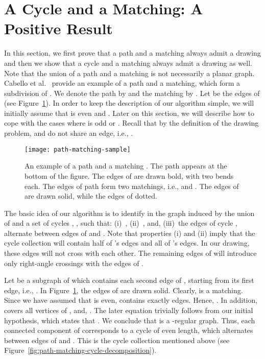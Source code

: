 \documentclass{llncs}
\begin{document}
\section{A Cycle and a Matching: A Positive Result}
\label{sec:cycle-matching}


In this section, we first prove that a path and a matching always
admit a  drawing and then we show that a cycle and a
matching always admit a  drawing as well. Note that the
union of a path and a matching is not necessarily a planar graph.
Cabello et al.\ \cite{CvKLMSV11} provide an example of a path and a
matching, which form a subdivision of . We denote the path
by  and the matching by . Let  be the edges of
 (see Figure~\ref{fig:path-matching-sample}). In order
to keep the description of our algorithm simple, we will initially
assume that  is even and . Later on this
section, we will describe how to cope with the cases where  is
odd or . Recall that by the definition of the
 drawing problem,  and  do not
share an edge, i.e., .





\begin{figure}[h!tb]
  \centering
  \texttt{[image: path-matching-sample]}
  \caption{An example of a path  and a matching .
  The path appears at the bottom of the figure. The edges of  are drawn bold, with two bends each.
  The edges of path  form two matchings, i.e., 
  and . The edges of  are drawn solid, while the edges of  dotted. }
  \label{fig:path-matching-sample}
\end{figure}

The basic idea of our algorithm is to identify in the graph induced
by the union of  and  a set of cycles
, ,
such that: (i)~, (ii)~, and, (iii)~the
edges of cycle ,   alternate between
edges of  and . Note that properties (i)
and (ii) imply that the cycle collection will contain half of
's edges and all of 's edges. In our
drawing, these edges will not cross with each other. The remaining
edges of  will introduce only right-angle crossings
with the edges of .

Let  be a subgraph of  which
contains each second edge of , starting from its first
edge, i.e., . In Figure~\ref{fig:path-matching-sample}, the
edges of  are drawn solid. Clearly,
 is a matching. Since we have assumed that  is
even,  contains exactly  edges. Hence,
. In addition,
 covers all vertices of , and,
. The later
equation trivially follows from our initial hypothesis, which states
that . We conclude
that  is a -regular graph.
Thus, each connected component of  corresponds to a cycle of even length, which alternates
between edges of  and . This is the
cycle collection mentioned above (see
Figure~\ref{fig:path-matching-cycle-decomposition}).
\end{document}

